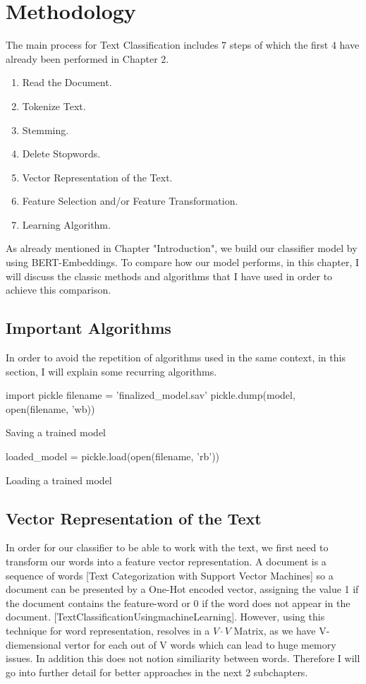 \documentclass[a4paper, 11pt,titlepage,oneside,openany]{book}
\begin{document}
\chapter{Methodology}
\noindent The main process for Text Classification includes 7 steps of which the first 4 have already been performed in Chapter 2.
\begin{enumerate}
	\item Read the Document.  
	\item Tokenize Text.
	\item Stemming.
	\item Delete Stopwords.
	\item Vector Representation of the Text.
	\item Feature Selection and/or Feature Transformation.
	\item Learning Algorithm.
\end{enumerate}
As already mentioned in Chapter "Introduction", we build our classifier model by using BERT-Embeddings. To compare how our model performs, in this chapter, I will discuss the classic methods and algorithms that I have used in order to achieve this comparison. \\	

\section{Important Algorithms}
In order to avoid the repetition of algorithms used in the same context, in this section, I will explain some recurring algorithms.
\begin{algorithm}
	\DontPrintSemicolon
	import pickle\;
	filename = 'finalized\_model.sav'\;
	pickle.dump(model, open(filename, 'wb))
	\caption{Saving a trained model}
\end{algorithm}
\begin{algorithm}
	\DontPrintSemicolon
	loaded\_model = pickle.load(open(filename, 'rb'))
	\caption{Loading a trained model}
\end{algorithm}

\section{Vector Representation of the Text}
In order for our classifier to be able to work with the text, we first need to transform our words into a feature vector representation. A document is a sequence of words [Text Categorization with Support Vector Machines] so a document can be presented by a One-Hot encoded vector, assigning the value 1 if the document contains the feature-word or 0 if the word does not appear in the document. [TextClassificationUsingmachineLearning]. However, using this technique for word representation, resolves in a $V \cdot V$ Matrix, as we have V-diemensional vertor for each out of V words which can lead to huge memory issues. In addition this does not notion similiarity between words. Therefore I will go into further detail for better approaches in the next 2 subchapters.
\end{document}

